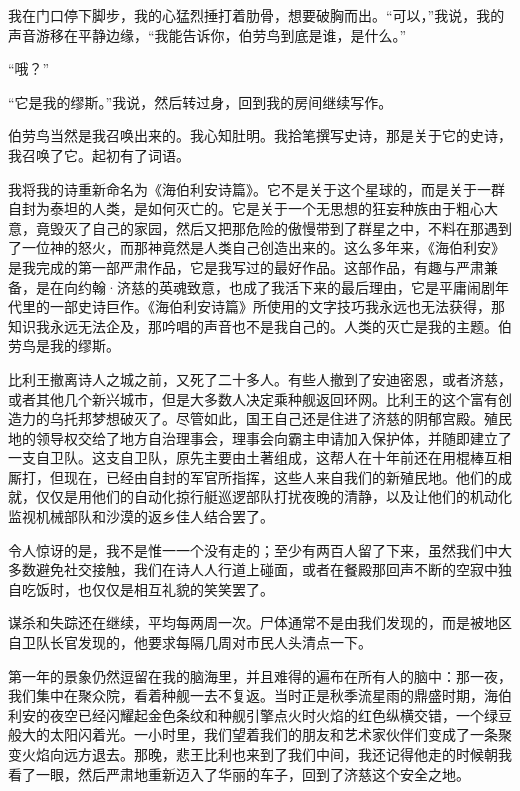 \documentclass[AutoFakeBold=true]{book}
\begin{document}
我在门口停下脚步，我的心猛烈捶打着肋骨，想要破胸而出。``可以，''我说，我的声音游移在平静边缘，``我能告诉你，伯劳鸟到底是谁，是什么。''

``哦？''

``它是我的缪斯。''我说，然后转过身，回到我的房间继续写作。

伯劳鸟当然是我召唤出来的。我心知肚明。我拾笔撰写史诗，那是关于它的史诗，我召唤了它。起初有了词语。

我将我的诗重新命名为《海伯利安诗篇》。它不是关于这个星球的，而是关于一群自封为泰坦的人类，是如何灭亡的。它是关于一个无思想的狂妄种族由于粗心大意，竟毁灭了自己的家园，然后又把那危险的傲慢带到了群星之中，不料在那遇到了一位神的怒火，而那神竟然是人类自己创造出来的。这么多年来，《海伯利安》是我完成的第一部严肃作品，它是我写过的最好作品。这部作品，有趣与严肃兼备，是在向约翰·济慈的英魂致意，也成了我活下来的最后理由，它是平庸闹剧年代里的一部史诗巨作。《海伯利安诗篇》所使用的文字技巧我永远也无法获得，那知识我永远无法企及，那吟唱的声音也不是我自己的。人类的灭亡是我的主题。伯劳鸟是我的缪斯。

比利王撤离诗人之城之前，又死了二十多人。有些人撤到了安迪密恩，或者济慈，或者其他几个新兴城市，但是大多数人决定乘种舰返回环网。比利王的这个富有创造力的乌托邦梦想破灭了。尽管如此，国王自己还是住进了济慈的阴郁宫殿。殖民地的领导权交给了地方自治理事会，理事会向霸主申请加入保护体，并随即建立了一支自卫队。这支自卫队，原先主要由土著组成，这帮人在十年前还在用棍棒互相厮打，但现在，已经由自封的军官所指挥，这些人来自我们的新殖民地。他们的成就，仅仅是用他们的自动化掠行艇巡逻部队打扰夜晚的清静，以及让他们的机动化监视机械部队和沙漠的返乡佳人结合罢了。

令人惊讶的是，我不是惟一一个没有走的；至少有两百人留了下来，虽然我们中大多数避免社交接触，我们在诗人人行道上碰面，或者在餐殿那回声不断的空寂中独自吃饭时，也仅仅是相互礼貌的笑笑罢了。

谋杀和失踪还在继续，平均每两周一次。尸体通常不是由我们发现的，而是被地区自卫队长官发现的，他要求每隔几周对市民人头清点一下。

第一年的景象仍然逗留在我的脑海里，并且难得的遍布在所有人的脑中：那一夜，我们集中在聚众院，看着种舰一去不复返。当时正是秋季流星雨的鼎盛时期，海伯利安的夜空已经闪耀起金色条纹和种舰引擎点火时火焰的红色纵横交错，一个绿豆般大的太阳闪着光。一小时里，我们望着我们的朋友和艺术家伙伴们变成了一条聚变火焰向远方退去。那晚，悲王比利也来到了我们中间，我还记得他走的时候朝我看了一眼，然后严肃地重新迈入了华丽的车子，回到了济慈这个安全之地。

\vspace*{1em}
\end{document}
